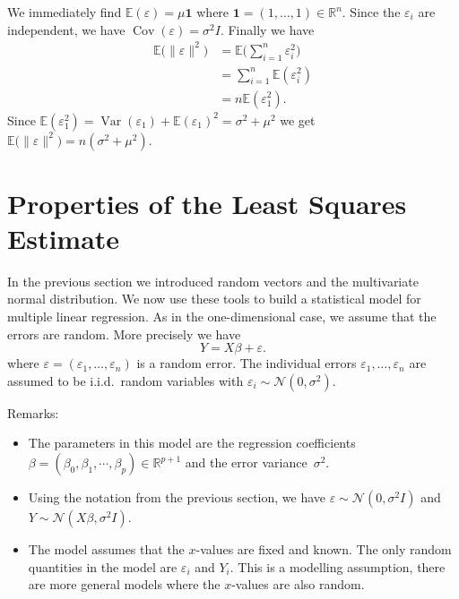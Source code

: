 \documentclass[
  a4paper,
]{article}
\theoremstyle{definition}
\theoremstyle{definition}
\theoremstyle{definition}
\theoremstyle{definition}
\theoremstyle{remark}
\begin{document}
\begin{myanswers}
We immediately find \(\mathbb{E}(\varepsilon) = \mu \mathbf{1}\) where
\(\mathbf{1} = (1, \ldots, 1) \in\mathbb{R}^n\). Since the \(\varepsilon_i\) are independent,
we have \(\mathop{\mathrm{Cov}}(\varepsilon) = \sigma^2 I\). Finally we have
\begin{align*}
  \mathbb{E}\bigl(\|\varepsilon\|^2\bigr)
  &= \mathbb{E}\bigl( \sum_{i=1}^n \varepsilon_i^2 \bigr) \\
  &= \sum_{i=1}^n \mathbb{E}(\varepsilon_i^2) \\
  &= n \mathbb{E}(\varepsilon_1^2).
\end{align*}
Since \(\mathbb{E}(\varepsilon_1^2) = \mathop{\mathrm{Var}}(\varepsilon_1) + \mathbb{E}(\varepsilon_1)^2 = \sigma^2 + \mu^2\)
we get \(\mathbb{E}\bigl(\|\varepsilon\|^2\bigr) = n (\sigma^2 + \mu^2)\).

\end{myanswers}

\clearpage

\section{Properties of the Least Squares Estimate}\label{S04-model}

In the previous section we introduced random vectors and the multivariate
normal distribution. We now use these tools to build a statistical model
for multiple linear regression. As in the one-dimensional case, we assume
that the errors are random. More precisely we have
\begin{equation}
  Y = X \beta + \varepsilon.  \label{eq:lmstats}
\end{equation}
where \(\varepsilon= (\varepsilon_1, \ldots, \varepsilon_n)\) is a random error.
The individual errors \(\varepsilon_1, \ldots, \varepsilon_n\)
are assumed to be i.i.d.~random variables with \(\varepsilon_i \sim \mathcal{N}(0, \sigma^2)\).

Remarks:

\begin{itemize}
\item
  The parameters in this model are the regression coefficients
  \(\beta = (\beta_0, \beta_1, \cdots, \beta_p) \in \mathbb{R}^{p+1}\) and
  the error variance~\(\sigma^2\).
\item
  Using the notation from the previous section, we have
  \(\varepsilon\sim \mathcal{N}(0, \sigma^2 I)\) and \(Y \sim \mathcal{N}(X\beta, \sigma^2 I)\).
\item
  The model assumes that the \(x\)-values are fixed and known. The only
  random quantities in the model are \(\varepsilon_i\) and \(Y_i\). This is a modelling
  assumption, there are more general models where the \(x\)-values are also
  random.
\end{itemize}
\end{document}
